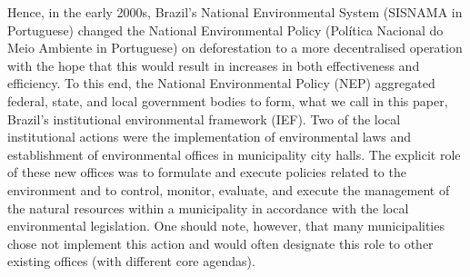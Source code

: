 Hence, in the early 2000s, Brazil's National Environmental System (SISNAMA in Portuguese) changed the National Environmental Policy (Pol\'{i}tica Nacional do Meio Ambiente in Portuguese) on deforestation to a more decentralised operation with the hope that this would result in increases in both effectiveness and efficiency. To this end, the National Environmental Policy (NEP) aggregated federal, state, and local government bodies to form, what we call in this paper, Brazil's institutional environmental framework (IEF). Two of the local institutional actions were the implementation of environmental laws and establishment of environmental offices in municipality city halls.  The explicit role of these new offices was to formulate and execute policies related to the environment and to control, monitor, evaluate, and execute the management of the natural resources within a municipality in accordance with the local environmental legislation. One should note, however, that many municipalities chose not implement this action and would often designate this role to other existing offices (with different core agendas).

